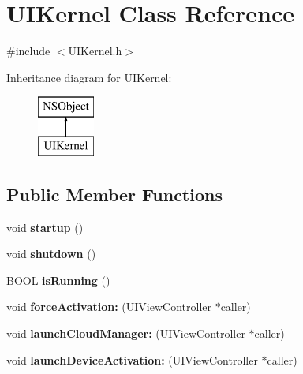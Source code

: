 \hypertarget{interface_u_i_kernel}{
\section{\-U\-I\-Kernel \-Class \-Reference}
\label{interface_u_i_kernel}
}


{\ttfamily \#include $<$\-U\-I\-Kernel.\-h$>$}

\-Inheritance diagram for \-U\-I\-Kernel\-:\begin{figure}[H]
\begin{center}
\leavevmode
\includegraphics[height=2.000000cm]{interface_u_i_kernel}
\end{center}
\end{figure}
\subsection*{\-Public \-Member \-Functions}
\begin{DoxyCompactItemize}
\item 
\hypertarget{interface_u_i_kernel_acacf4a426cf59fae1d5c64ddf3e0eca5}{
void {\bfseries startup} ()}
\label{interface_u_i_kernel_acacf4a426cf59fae1d5c64ddf3e0eca5}

\item 
\hypertarget{interface_u_i_kernel_aa87848b5862041cfe4af17fa9ea80194}{
void {\bfseries shutdown} ()}
\label{interface_u_i_kernel_aa87848b5862041cfe4af17fa9ea80194}

\item 
\hypertarget{interface_u_i_kernel_a12b1b335a7feb23e72621a289fcc7354}{
\-B\-O\-O\-L {\bfseries is\-Running} ()}
\label{interface_u_i_kernel_a12b1b335a7feb23e72621a289fcc7354}

\item 
\hypertarget{interface_u_i_kernel_ad06e5ea4e9b84a3301bf540d4f542b86}{
void {\bfseries force\-Activation\-:} (\-U\-I\-View\-Controller $\ast$caller)}
\label{interface_u_i_kernel_ad06e5ea4e9b84a3301bf540d4f542b86}

\item 
\hypertarget{interface_u_i_kernel_a1c79d52404091b0c5f93fc4c8a21db26}{
void {\bfseries launch\-Cloud\-Manager\-:} (\-U\-I\-View\-Controller $\ast$caller)}
\label{interface_u_i_kernel_a1c79d52404091b0c5f93fc4c8a21db26}

\item 
\hypertarget{interface_u_i_kernel_a4159ec731bf960ac27e919e841cbceb8}{
void {\bfseries launch\-Device\-Activation\-:} (\-U\-I\-View\-Controller $\ast$caller)}
\label{interface_u_i_kernel_a4159ec731bf960ac27e919e841cbceb8}

\end{DoxyCompactItemize}
